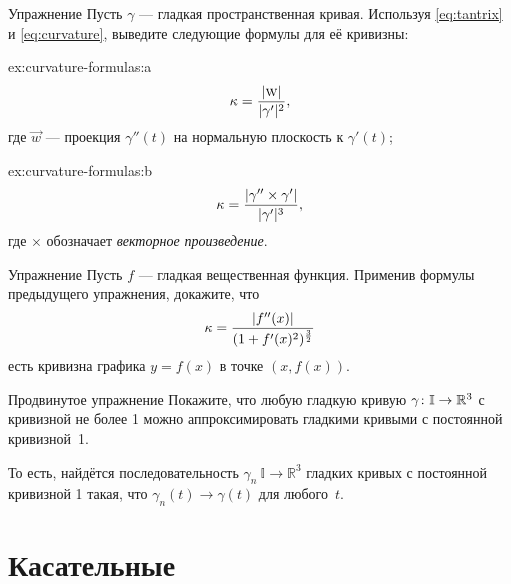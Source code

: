 \begin{thm}{Упражнение}\label{ex:curvature-formulas}
Пусть $\gamma$ --- гладкая пространственная кривая.
Используя \ref{eq:tantrix} и \ref{eq:curvature}, выведите следующие формулы для её кривизны:
\setlength{\columnseprule}{0.4pt}
\begin{multicols}{2}

\begin{subthm}{ex:curvature-formulas:a} 
\[\kappa=\frac{|\text{\sc{w}}|}{|\gamma'|^2},\]
где $\vec w$ --- проекция $\gamma''(t)$ на нормальную плоскость к $\gamma'(t)$;
\end{subthm}

\columnbreak

\begin{subthm}{ex:curvature-formulas:b}
\[\kappa=\frac{|\gamma''\times \gamma'|}{|\gamma'|^{3}},\]
где $\times$ обозначает \emph{векторное произведение}.
\end{subthm}

\vfill\null
\end{multicols}
\end{thm}

{\sloppy

\begin{thm}{Упражнение}\label{ex:curvature-graph}
Пусть $f$ --- гладкая вещественная функция.
Применив формулы предыдущего упражнения, докажите, что 
\[\kappa=\frac{|f''(x)|}{(1+f'(x)^2)^{\frac32}}\]
есть кривизна графика $y=f(x)$ в точке $(x,f(x))$. 
\end{thm}

}

\begin{thm}{Продвинутое упражнение}\label{ex:approximation-const-curvature}
Покажите, что любую гладкую кривую $\gamma\:\mathbb{I}\z\to\mathbb{R}^3$ с кривизной не более 1 можно аппроксимировать гладкими кривыми с постоянной кривизной~1.

То есть, найдётся последовательность $\gamma_n\:\mathbb{I}\to\mathbb{R}^3$ гладких кривых с постоянной кривизной 1 такая, что $\gamma_n(t)\to \gamma(t)$ для любого~$t$.
\end{thm}


\section{Касательные}

